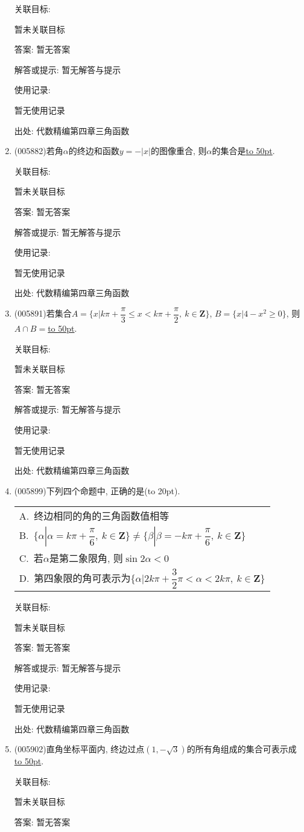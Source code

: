 \documentclass[10pt,a4paper]{article}
\newcommand{\blank}[1]{\underline{\hbox to #1pt{}}}
\newcommand{\bracket}[1]{(\hbox to #1pt{})}
\newcommand{\onech}[4]{\par\begin{tabular}{p{.9\textwidth}}
A.~#1\\
B.~#2\\
C.~#3\\
D.~#4
\end{tabular}}
\begin{document}
\begin{enumerate}[1.]
关联目标:

暂未关联目标

答案: 暂无答案

解答或提示: 暂无解答与提示

使用记录:

暂无使用记录


出处: 代数精编第四章三角函数
\item { (005882)}若角$\alpha$的终边和函数$y=-|x|$的图像重合, 则$\alpha$的集合是\blank{50}.


关联目标:

暂未关联目标

答案: 暂无答案

解答或提示: 暂无解答与提示

使用记录:

暂无使用记录


出处: 代数精编第四章三角函数
\item { (005891)}若集合$A=\{x|k\pi +\dfrac{\pi}3\le x<k\pi +\dfrac{\pi}2, \ k\in \mathbf{Z}\}$, $B=\{x|4-x^2\ge 0\}$, 则$A\cap B=$\blank{50}.


关联目标:

暂未关联目标

答案: 暂无答案

解答或提示: 暂无解答与提示

使用记录:

暂无使用记录


出处: 代数精编第四章三角函数
\item { (005899)}下列四个命题中, 正确的是\bracket{20}.
\onech{终边相同的角的三角函数值相等}{$\{\alpha|\alpha =k\pi +\dfrac{\pi}6,\ k\in \mathbf{Z}\}\ne \{\beta|\beta =-k\pi +\dfrac{\pi}6,\ k\in \mathbf{Z}\}$}{若$\alpha$是第二象限角, 则$\sin 2\alpha <0$}{第四象限的角可表示为$\{\alpha|2k\pi +\dfrac 32\pi <\alpha <2k\pi ,\ k\in \mathbf{Z}\}$}


关联目标:

暂未关联目标

答案: 暂无答案

解答或提示: 暂无解答与提示

使用记录:

暂无使用记录


出处: 代数精编第四章三角函数
\item { (005902)}直角坐标平面内, 终边过点$(1,-\sqrt 3)$的所有角组成的集合可表示成\blank{50}.


关联目标:

暂未关联目标

答案: 暂无答案


\end{enumerate}
\end{document}
